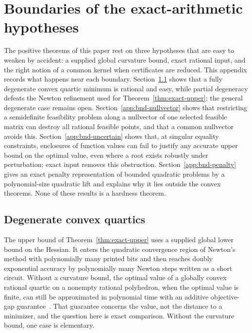 \section{Boundaries of the exact-arithmetic hypotheses}
\label{app:boundaries}

The positive theorems of this paper rest on three hypotheses that are easy to
weaken by accident: a supplied global curvature bound, exact rational input,
and the right notion of a common kernel when certificates are reduced. This
appendix records what happens near each boundary. Section~\ref{app:bnd-degenerate}
shows that a fully degenerate convex quartic minimum is rational and easy,
while partial degeneracy defeats the Newton refinement used for
Theorem~\ref{thm:exact-upper}; the general degenerate case remains open.
Section~\ref{app:bnd-nullvector} shows that restricting a semidefinite
feasibility problem along a nullvector of one selected feasible matrix can
destroy all rational feasible points, and that a common nullvector avoids
this. Section~\ref{app:bnd-uncertain} shows that, at singular equality
constraints, enclosures of function values can fail to justify any accurate
upper bound on the optimal value, even where a root exists robustly under
perturbation; exact input removes this obstruction.
Section~\ref{app:bnd-penalty} gives an exact penalty representation of
bounded quadratic problems by a polynomial-size quadratic lift and explains
why it lies outside the convex theorems. None of these results is a hardness
theorem.

\subsection{Degenerate convex quartics}
\label{app:bnd-degenerate}

The upper bound of Theorem~\ref{thm:exact-upper} uses a supplied global lower
bound on the Hessian. It enters the quadratic convergence region of Newton's
method with polynomially many printed bits and then reaches doubly
exponential accuracy by polynomially many Newton steps written as a short
circuit. Without a curvature bound, the optimal value of a globally convex
rational quartic on a nonempty rational polyhedron, when the optimal value
is finite, can still be approximated in polynomial time with an additive objective-gap
guarantee~\cite[Corollary~1.2]{SlotSteurerWiedmer2025}. That guarantee
concerns the value, not the distance to a minimizer, and the question here
is exact comparison. Without the curvature bound, one case is elementary.

